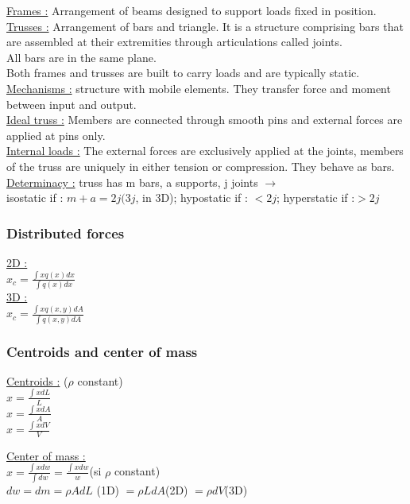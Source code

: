\documentclass[../main.tex]{subfiles}
\begin{document}
\quad \underline{Frames :} Arrangement of beams designed to support loads fixed in position.\\

\quad \underline{Trusses :} Arrangement of bars and triangle. It is a structure comprising bars that are assembled at their extremities through articulations called joints.\\

\quad \quad All bars are in the same plane.\\

Both frames and trusses are built to carry loads and are typically static.\\

\quad \underline{Mechanisms :} structure with mobile elements. They transfer force and moment between input and output.\\

\quad \underline{Ideal truss :} Members are connected through smooth pins and external forces are applied at pins only.\\

\quad \underline{Internal loads :} The external forces are exclusively applied at the joints, members of the truss are uniquely in either tension or compression. They behave as bars.\\

\quad \underline{Determinacy :} truss has m bars, a supports, j joints $\rightarrow$ \\
isostatic if : $m+a = 2j(3j$, in 3D); hypostatic if : $< 2j$; hyperstatic if :$> 2j$\\

\subsubsection{Distributed forces}
\underline{2D :}\\
$x_c = \frac{\int xq(x) dx}{\int q(x)dx}$\\

\underline{3D :}\\
$x_c = \frac{\int x q(x,y)dA}{\int q(x,y)dA}$\\

\subsubsection{Centroids and center of mass}
\begin{minipage}{.5\textwidth}
    \quad \underline{Centroids :} ($\rho$ constant)\\
$x = \frac{\int xdL}{L}$\\
$x= \frac{\int xdA}{A}$\\
$x = \frac{\int xdV}{V}$\\
\end{minipage}
\hfill
\begin{minipage}{.5\textwidth}
    \quad \underline{Center of mass :}\\
    $x = \frac{\int xdw}{\int dw} = \frac{\int xdw}{w}$(si $\rho$ constant)\\
    $dw = dm = \rho A dL$ (1D) $ = \rho L dA$(2D) $= \rho dV$(3D)\\
\end{minipage}
\end{document}
